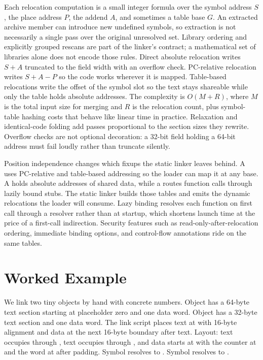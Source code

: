 Each relocation computation is a small integer formula over the symbol address $S$, the place address $P$, the addend $A$, and sometimes a table base $G$.
An extracted archive member can introduce new undefined symbols, so extraction is not necessarily a single pass over the original unresolved set.
Library ordering and explicitly grouped rescans are part of the linker's contract; a mathematical set of libraries alone does not encode those rules.
Direct absolute relocation writes $S + A$ truncated to the field width with an overflow check.
PC-relative relocation writes $S + A - P$ so the code works wherever it is mapped.
Table-based relocations write the offset of the symbol slot so the text stays shareable while only the table holds absolute addresses.
The complexity is $O(M + R)$, where $M$ is the total input size for merging and $R$ is the relocation count, plus symbol-table hashing costs that behave like linear time in practice.
Relaxation and identical-code folding add passes proportional to the section sizes they rewrite.
Overflow checks are not optional decoration: a 32-bit field holding a 64-bit address must fail loudly rather than truncate silently.

Position independence changes which fixups the static linker leaves behind.
A  uses PC-relative and table-based addressing so the loader can map it at any base.
A  holds absolute addresses of shared data, while a  routes function calls through lazily bound stubs.
The static linker builds those tables and emits the dynamic relocations the loader will consume.
Lazy binding resolves each function on first call through a resolver rather than at startup, which shortens launch time at the price of a first-call indirection.
Security features such as read-only-after-relocation ordering, immediate binding options, and control-flow annotations ride on the same tables.

\section{Worked Example}\label{sec:ch29-worked}

We link two tiny objects by hand with concrete numbers.
Object  has a 64-byte text section starting at placeholder zero and one data word.
Object  has a 32-byte text section and one data word.
The link script places text at  with 16-byte alignment and data at the next 16-byte boundary after text.
Layout:  text occupies  through ,  text occupies  through , and data starts at  with the  counter at  and the  word at  after padding.
Symbol  resolves to .
Symbol  resolves to .


